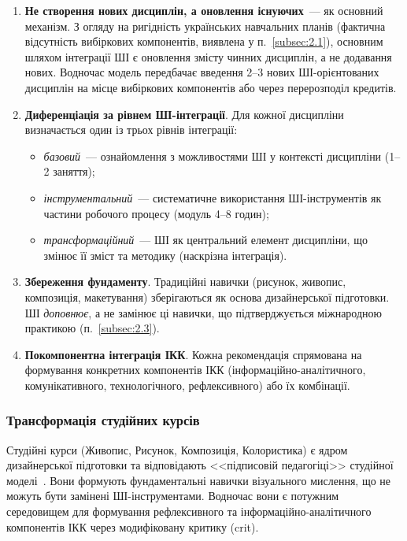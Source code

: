 \begin{enumerate}
    \item \textbf{Не створення нових дисциплін, а оновлення існуючих}~--- як основний механізм. З огляду на ригідність українських навчальних планів (фактична відсутність вибіркових компонентів, виявлена у п.~\ref{subsec:2.1}), основним шляхом інтеграції ШІ є оновлення змісту чинних дисциплін, а не додавання нових. Водночас модель передбачає введення 2--3 нових ШІ-орієнтованих дисциплін на місце вибіркових компонентів або через перерозподіл кредитів.

    \item \textbf{Диференціація за рівнем ШІ-інтеграції}. Для кожної дисципліни визначається один із трьох рівнів інтеграції:
    \begin{itemize}
        \item \textit{базовий}~--- ознайомлення з можливостями ШІ у контексті дисципліни (1--2 заняття);
        \item \textit{інструментальний}~--- систематичне використання ШІ-інструментів як частини робочого процесу (модуль 4--8 годин);
        \item \textit{трансформаційний}~--- ШІ як центральний елемент дисципліни, що змінює її зміст та методику (наскрізна інтеграція).
    \end{itemize}

    \item \textbf{Збереження фундаменту}. Традиційні навички (рисунок, живопис, композиція, макетування) зберігаються як основа дизайнерської підготовки. ШІ \textit{доповнює}, а не замінює ці навички, що підтверджується міжнародною практикою (п.~\ref{subsec:2.3}).

    \item \textbf{Покомпонентна інтеграція ІКК}. Кожна рекомендація спрямована на формування конкретних компонентів ІКК (інформаційно-аналітичного, комунікативного, технологічного, рефлексивного) або їх комбінації.
\end{enumerate}

\subsubsection{Трансформація студійних курсів}\label{sssec:3.2.2}

Студійні курси (Живопис, Рисунок, Композиція, Колористика) є ядром дизайнерської підготовки та відповідають <<підписовій педагогіці>> студійної моделі~\cite{Musiienko2026ScopingReview}. Вони формують фундаментальні навички візуального мислення, що не можуть бути замінені ШІ-інструментами. Водночас вони є потужним середовищем для формування рефлексивного та інформаційно-аналітичного компонентів ІКК через модифіковану критику (crit).

